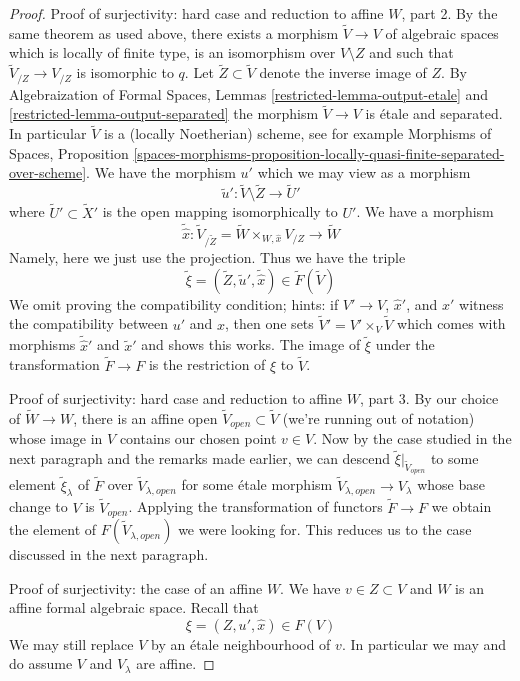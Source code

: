 \begin{proof}
\medskip\noindent
Proof of surjectivity: hard case and reduction to affine $W$, part 2.
By the same theorem as used above, there exists a morphism
$\tilde V \to V$ of algebraic spaces which is locally of finite type,
is an isomorphism over $V \setminus Z$ and such that
$\tilde V_{/Z} \to V_{/Z}$ is isomorphic to $q$.
Let $\tilde Z \subset \tilde V$ denote the inverse image of $Z$.
By Algebraization of Formal Spaces, Lemmas
\ref{restricted-lemma-output-etale} and \ref{restricted-lemma-output-separated}
the morphism $\tilde V \to V$ is \'etale and separated.
In particular $\tilde V$ is a (locally Noetherian) scheme, see for example
Morphisms of Spaces, Proposition
\ref{spaces-morphisms-proposition-locally-quasi-finite-separated-over-scheme}.
We have the morphism $u'$ which we may view as a morphism
$$
\tilde u' : \tilde V \setminus \tilde Z \longrightarrow \tilde U'
$$
where $\tilde U' \subset \tilde X'$ is the open mapping isomorphically
to $U'$. We have a morphism
$$
\tilde {\hat x} :
\tilde V_{/\tilde Z} = \tilde W \times_{W, \hat x} V_{/Z}
\longrightarrow
\tilde W
$$
Namely, here we just use the projection. Thus we have the triple
$$
\tilde \xi = (\tilde Z, \tilde u', \tilde {\hat x}) \in \tilde F(\tilde V)
$$
We omit proving the compatibility condition; hints: if $V' \to V$, $\hat x'$,
and $x'$ witness the compatibility between $u'$ and $\hat x$, then one
sets $\tilde V' = V' \times_V \tilde V$ which comes with morphisms
$\tilde{\hat x}'$ and $\tilde x'$ and shows this works.
The image of $\tilde \xi$ under the transformation $\tilde F \to F$
is the restriction of $\xi$ to $\tilde V$.

\medskip\noindent
Proof of surjectivity: hard case and reduction to affine $W$, part 3.
By our choice of $\tilde W \to W$, there is an affine open
$\tilde V_{open} \subset \tilde V$ (we're running out of notation)
whose image in $V$ contains our chosen point $v \in V$.
Now by the case studied in the next paragraph and the remarks made
earlier, we can descend $\tilde \xi|_{\tilde V_{open}}$
to some element $\tilde \xi_\lambda$ of $\tilde F$ over
$\tilde V_{\lambda, open}$
for some \'etale morphism $\tilde V_{\lambda, open} \to V_\lambda$
whose base change to $V$ is $\tilde V_{open}$.
Applying the transformation of functors $\tilde F \to F$
we obtain the element of $F(\tilde V_{\lambda, open})$
we were looking for. This reduces us to the case discussed
in the next paragraph.

\medskip\noindent
Proof of surjectivity: the case of an affine $W$. We have $v \in Z \subset V$
and $W$ is an affine formal algebraic space. Recall that
$$
\xi = (Z, u', \hat x) \in F(V)
$$
We may still replace $V$ by an \'etale neighbourhood of $v$.
In particular we may and do assume $V$ and $V_\lambda$ are affine.


\end{proof}
